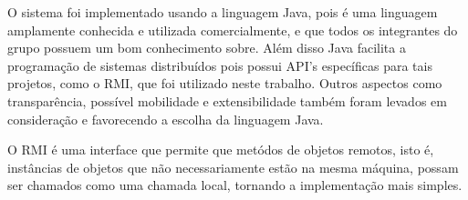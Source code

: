 \documentclass[../main.tex]{subfiles}
\begin{document}
O sistema foi implementado usando a linguagem Java, pois é uma linguagem amplamente conhecida e utilizada comercialmente, e que todos os integrantes do grupo possuem um bom conhecimento sobre. Além disso Java facilita a programação de sistemas distribuídos pois possui API's específicas para tais projetos, como o RMI, que foi utilizado neste trabalho. Outros aspectos como transparência, possível mobilidade e extensibilidade também foram levados em consideração e favorecendo a escolha da linguagem Java.

O RMI é uma interface que permite que metódos de objetos remotos, isto é, instâncias de objetos que não necessariamente estão na mesma máquina, possam ser chamados como uma chamada local, tornando a implementação mais simples. 
\end{document}
